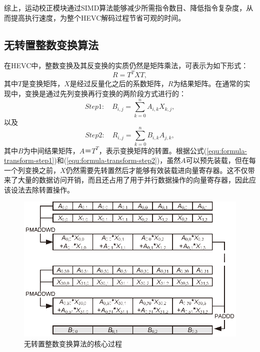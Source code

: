 综上，运动校正模块通过SIMD算法能够减少所需指令数目、降低指令复杂度，从而提高执行速度，为整个HEVC解码过程节省可观的时间。

\subsection{无转置整数变换算法}

在HEVC中，整数变换及其反变换的实质仍然是矩阵乘法，可表示为如下形式：
\begin{equation}
R = T^TXT,
\end{equation}
其中$T$是变换矩阵，$X$是经过反量化之后的系数矩阵，$R$为结果矩阵。在通常的实现中，变换是通过先列变换再行变换的两阶段方式进行的：
\begin{equation}\label{equ:formula-transform-step1}
Step1:	\quad B_{i,j} = \sum_{k=0}^n A_{i,k}X_{k,j},
\end{equation}
以及
\begin{equation}\label{equ:formula-transform-step2}
Step2:	\quad R_{i,j} = \sum_{k=0}^n B_{i,k}A_{j,k},
\end{equation}
其中$B$为中间结果矩阵，$A ＝ T^T$，表示变换矩阵的转置。根据公式(\ref{equ:formula-transform-step1})和(\ref{equ:formula-transform-step2})，虽然$A$可以预先装载，但在每一个列变换之前，$X$仍然需要先转置然后才能够有效装载进向量寄存器。这不仅带来了大量的数据访问开销，而且还占用了用于并行数据操作的向量寄存器，因此应该设法去除转置操作。

\begin{figure}[!t]
	\centering
	\includegraphics[width = 0.95\linewidth]{eps/transpose-free_IT}
	\caption{\label{fig:transpose-free_IT}
		无转置整数变换算法的核心过程}
\end{figure}

